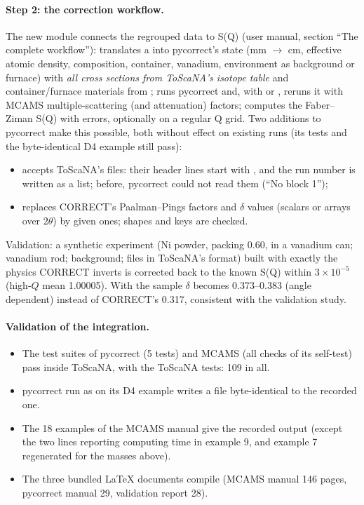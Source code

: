 \documentclass[11pt,a4paper]{article}
\begin{document}
\paragraph{Step 2: the correction workflow.} The new module
 connects the regrouped data to S(Q)
(user manual, section ``The complete workflow''):
 translates a  into pycorrect's state
(mm $\to$ cm, effective atomic density, composition, container, vanadium,
environment as background or furnace) with \emph{all cross sections from
ToScaNA's isotope table} and container/furnace materials from
;  runs pycorrect and, with
 or , reruns it with MCAMS multiple-scattering
(and attenuation) factors;  computes the Faber--Ziman
S(Q) with errors, optionally on a regular Q grid. Two additions to pycorrect
make this possible, both without effect on existing runs (its tests and the
byte-identical D4 example still pass):
\begin{itemize}
  \item {} accepts ToScaNA's  files: their
    header lines start with \code{\#}, and the run number is written as a
    list; before, pycorrect could not read them (``No block 1'');
  \item {} replaces CORRECT's
    Paalman--Pings factors and $\delta$ values (scalars or arrays over
    $2\theta$) by given ones; shapes and keys are checked.
\end{itemize}
Validation: a synthetic experiment (Ni powder, packing 0.60, in a vanadium
can; vanadium rod; background; files in ToScaNA's  format) built
with exactly the physics CORRECT inverts is corrected back to the known S(Q)
within $3\times10^{-5}$ (high-$Q$ mean 1.00005). With  the
sample $\delta$ becomes 0.373--0.383 (angle dependent) instead of CORRECT's
0.317, consistent with the validation study.

\paragraph{Validation of the integration.}
\begin{itemize}
  \item The test suites of pycorrect (5 tests) and MCAMS (all checks of its
    self-test) pass inside ToScaNA, with the ToScaNA tests: 109 in all.
  \item pycorrect run as  on its
    D4 example writes a file byte-identical to the recorded one.
  \item The 18 examples of the MCAMS manual give the recorded output (except
    the two lines reporting computing time in example 9, and example 7
    regenerated for the masses above).
  \item The three bundled LaTeX documents compile (MCAMS manual 146 pages,
    pycorrect manual 29, validation report 28).
\end{itemize}
\end{document}
